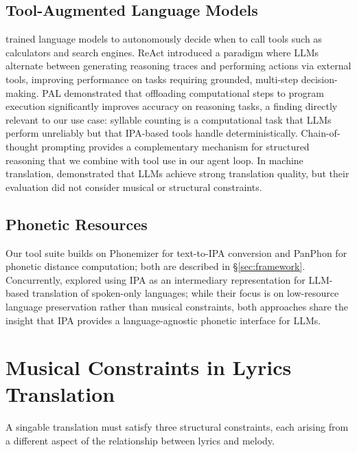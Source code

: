 \documentclass[11pt]{article}
\begin{document}
\subsection{Tool-Augmented Language Models}

\citet{schick-etal-2023-toolformer} trained language models to autonomously decide when to call tools such as calculators and search engines.
ReAct \citep{yao-etal-2023-react} introduced a paradigm where LLMs alternate between generating reasoning traces and performing actions via external tools, improving performance on tasks requiring grounded, multi-step decision-making.
PAL \citep{gao-etal-2023-pal} demonstrated that offloading computational steps to program execution significantly improves accuracy on reasoning tasks, a finding directly relevant to our use case: syllable counting is a computational task that LLMs perform unreliably but that IPA-based tools handle deterministically.
Chain-of-thought prompting \citep{wei-etal-2022-chain} provides a complementary mechanism for structured reasoning that we combine with tool use in our agent loop.
In machine translation, \citet{jiao-etal-2023-chatgpt} demonstrated that LLMs achieve strong translation quality, but their evaluation did not consider musical or structural constraints.

\subsection{Phonetic Resources}

Our tool suite builds on Phonemizer \citep{bernard-titeux-2021-phonemizer} for text-to-IPA conversion and PanPhon \citep{mortensen-etal-2016-panphon} for phonetic distance computation; both are described in \S\ref{sec:framework}.
Concurrently, \citet{chen-etal-2025-ipa-translation} explored using IPA as an intermediary representation for LLM-based translation of spoken-only languages; while their focus is on low-resource language preservation rather than musical constraints, both approaches share the insight that IPA provides a language-agnostic phonetic interface for LLMs.

\section{Musical Constraints in Lyrics Translation}
\label{sec:constraints}

A singable translation must satisfy three structural constraints, each arising from a different aspect of the relationship between lyrics and melody.
\end{document}
